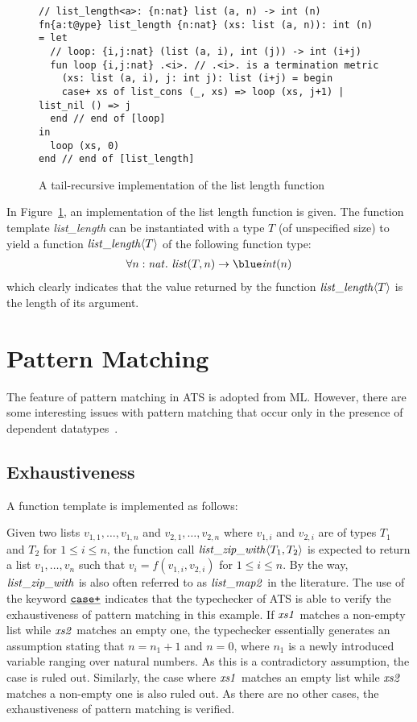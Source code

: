 \begin{figure}[thp]
\begin{verbatim}
// list_length<a>: {n:nat} list (a, n) -> int (n)
fn{a:t@ype} list_length {n:nat} (xs: list (a, n)): int (n) = let
  // loop: {i,j:nat} (list (a, i), int (j)) -> int (i+j)
  fun loop {i,j:nat} .<i>. // .<i>. is a termination metric
    (xs: list (a, i), j: int j): list (i+j) = begin
    case+ xs of list_cons (_, xs) => loop (xs, j+1) | list_nil () => j
  end // end of [loop]
in
  loop (xs, 0)
end // end of [list_length]
\end{verbatim}
\caption{A tail-recursive implementation of the list length function}
\label{figure:list_length_function}
\end{figure}
In Figure~\ref{figure:list_length_function}, an implementation of the list
length function is given. The function template {\it list\_length} can be
instantiated with a type $T$ (of unspecified size) to yield a function
${\it list\_length}\langle T\rangle$ of the following function type:
\[\begin{array}{l}
\forall n:\snat.~\tlist(T, n)\timp \tint(n) \\
\end{array}\]
which clearly indicates that the value returned by the function
${\it list\_length}\langle T\rangle$ is the length of its argument.

\section{Pattern Matching}
The feature of pattern matching in ATS is adopted from ML. However,
there are some interesting issues with pattern matching that occur
only in the presence of dependent datatypes~\cite{DTPM-jucs03}.

\subsection{Exhaustiveness}
A function template is implemented as follows:

Given two lists $v_{1,1},\ldots, v_{1,n}$ and $v_{2,1},\ldots, v_{2,n}$
where $v_{1,i}$ and $v_{2,i}$ are of types $T_1$ and $T_2$ for $1\leq i\leq
n$, the function call ${\it list\_zip\_with}\langle T_1,T_2\rangle$ is
expected to return a list $v_1,\ldots,v_n$ such that
$v_i=f(v_{1,i},v_{2,i})$ for $1\leq i\leq n$.  By the way, ${\it
list\_zip\_with}$ is also often referred to as ${\it list\_map2}$ in the
literature.  The use of the keyword $\underline{\texttt{case+}}$ indicates that the
typechecker of ATS is able to verify the exhaustiveness of pattern matching
in this example. If ${\it xs1}$ matches a non-empty list while ${\it xs2}$
matches an empty one, the typechecker essentially generates an assumption
stating that $n=n_1+1$ and $n=0$, where $n_1$ is a newly introduced
variable ranging over natural numbers. As this is a contradictory
assumption, the case is ruled out. Similarly, the case where ${\it xs1}$
matches an empty list while ${\it xs2}$ matches a non-empty one is also
ruled out.  As there are no other cases, the exhaustiveness of pattern
matching is verified.

